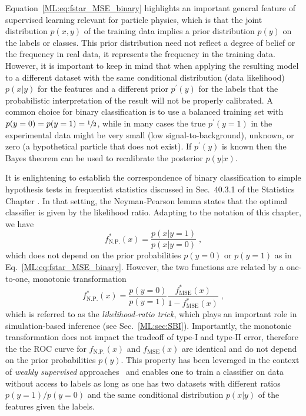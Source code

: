 Equation~\ref{ML:eq:fstar_MSE_binary} highlights an important general feature of supervised learning relevant for particle physics, which is that the joint distribution $p(x,y)$ of the training data  implies a prior distribution $p(y)$ on the labels or classes. This prior distribution need not reflect a degree of belief or the frequency in real data, it represents the frequency in the training data. However, it is important to keep in mind that when applying the resulting model to a different dataset with the same conditional distribution (data likelihood) $p(x|y)$ for the features and a different prior $p^\prime(y)$ for the labels that the probabilistic interpretation of the result will not be properly calibrated. A common choice for binary classification is to use a balanced training set with $p(y=0)=p(y=1)=\sfrac{1}{2}$, while in many cases the true $p^\prime(y=1)$ in the experimental data might be very small (\ie low signal-to-background), unknown, or zero (\ie a hypothetical particle that does not exist). If $p^\prime(y)$ is known then the Bayes theorem 
can be used to recalibrate the posterior
$p(y|x)$. 

It is enlightening to establish the correspondence of binary classification to simple hypothesis tests in frequentist statistics discussed in Sec.~40.3.1 of the Statistics Chapter . In that setting, the Neyman-Pearson lemma states that the optimal classifier is given by the likelihood ratio. Adapting to the notation of this chapter, we have
\begin{equation}
    \label{ML:eq:fstar_neyman-pearson}
    f^*_\textrm{N.P.}(x) = \frac{p(x|y=1)}{p(x|y=0)} \;,
\end{equation}
which does not depend on the prior probabilities $p(y=0)$ or $p(y=1)$ as in Eq.~\ref{ML:eq:fstar_MSE_binary}. However, the two functions are related by a one-to-one, monotonic transformation
\begin{equation}
    \label{ML:eq:lrt}
    f^*_\textrm{N.P.}(x) = \frac{p(y=0)}{p(y=1)}\frac{f^*_\textrm{MSE}(x)}{1-f^*_\textrm{MSE}(x)} \;,
\end{equation}
which is referred to as the \textit{likelihood-ratio trick}, which plays an important role in simulation-based inference (see Sec.~\ref{ML:sec:SBI}). Importantly, the monotonic transformation does not impact the tradeoff of type-I and type-II error, therefore the  \ie the ROC curve for $f_\textrm{N.P.}(x)$ and $f_\textrm{MSE}(x)$ are identical and do not depend on the prior probabilities $p(y)$. This property has been leveraged in the context of \textit{weakly supervised} approaches~\cite{Metodiev:2017vrx} and enables one to train a classifier on data without access to labels as long as one has two datasets with different ratios $p(y=1)/p(y=0)$ and the same conditional distribution $p(x|y)$ of the features given the labels. 

